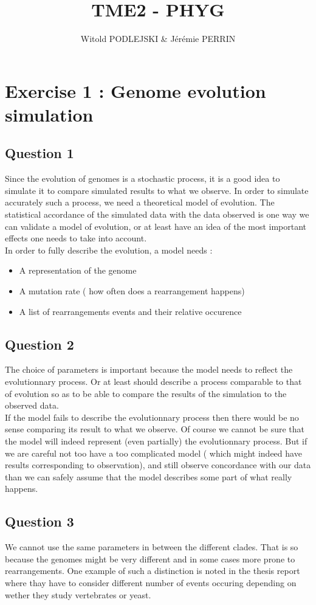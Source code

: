 \documentclass[]{article}
\title{TME2 - PHYG}
\author{Witold PODLEJSKI \& Jérémie PERRIN}
\theoremstyle{definition}
\begin{document}
\maketitle

\section{Exercise 1 : Genome evolution simulation}
\subsection{Question 1}
Since the evolution of genomes is a stochastic process, it is a good idea to simulate it to compare simulated results to what we observe. In order to simulate accurately such a process, we need a theoretical model of evolution. The statistical accordance of the simulated data with the data observed is one way we can validate a model of evolution, or at least have an idea of the most important effects one needs to take into account.\\
In order to fully describe the evolution, a model needs :
\begin{itemize}
	\item A representation of the genome
	\item A mutation rate ( how often does a rearrangement happens)
	\item A list of rearrangements events and their relative occurence
\end{itemize}
 
\subsection{Question 2}
The choice of parameters is important because the model needs to reflect the evolutionnary process. Or at least should describe a process comparable to that of evolution so as to be able to compare the results of the simulation to the observed data.\\
If the model fails to describe the evolutionnary process then there would be no sense comparing its result to what we observe. Of course we cannot be sure that the model will indeed represent (even partially) the evolutionnary process. But if we are careful not too have a too complicated model ( which might indeed have results corresponding to observation), and still observe concordance with our data than we can safely assume that the model describes some part of what really happens.

\subsection{Question 3}
We cannot use the same parameters in between the different clades. That is so because the genomes might be very different and in some cases more prone to rearrangements. One example of such a distinction is noted in the thesis report where thay have to consider different number of events occuring depending on wether they study vertebrates or yeast.
\end{document}
